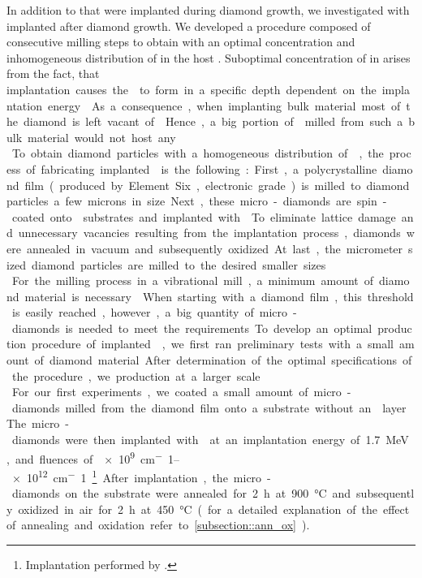 	In addition to \sivs that were implanted during diamond growth, we investigated \nds with \sivs implanted after diamond growth.
	We developed a procedure composed of consecutive milling steps to obtain \nds with an optimal concentration and inhomogeneous distribution of \sivs in the host \nds.
	Suboptimal concentration of \sivs in \nds arises from the fact, that \si implantation causes the \sivs to form in a specific depth dependent on the implantation energy.
	As a consequence, when implanting bulk material most of the diamond is left vacant of \sivs.
	Hence, a big portion of \nds milled from such a bulk material would not host any \sivs.
	\\
	To obtain diamond particles with a homogeneous distribution of \sivs, the process of fabricating implanted \nds is the following:
	First, a polycrystalline diamond film (produced by Element Six, electronic grade) is milled to diamond particles a few microns in size.
	Next, these micro-diamonds are spin-coated onto \ir substrates and implanted with .
	To eliminate lattice damage and unnecessary vacancies resulting from the implantation process, diamonds were annealed in vacuum and subsequently oxidized.
	At last, the micrometer sized diamond particles are milled to the desired smaller sizes.
	\\
	For the milling process in a vibrational mill, a minimum amount of diamond material is necessary.
	When starting with a diamond film, this threshold is easily reached, however, a big quantity of micro-diamonds is needed to meet the requirements.
	To develop an optimal production procedure of implanted \nds, we first ran preliminary tests with a small amount of diamond material.
	After determination of the optimal specifications of the procedure, we production at a larger scale. 
	\\
	For our first experiments, we coated a small amount of micro-diamonds milled from the diamond film onto a \si substrate without an \ir layer.
	The micro-diamonds were then implanted with  at an implantation energy of \SI{1.7}{MeV}, and fluences of \SIrange{e9}{e12}{cm^-1}\footnote{Implantation performed by \rogalla.}.
	After implantation, the micro-diamonds on the \si substrate were annealed for \SI{2}{\hour} at \SI{900}{\celsius} and subsequently oxidized in air for \SI{2}{\hour} at \SI{450}{\celsius} (for a detailed explanation of the effect of annealing and oxidation refer to \cref{subsection::ann_ox}).
